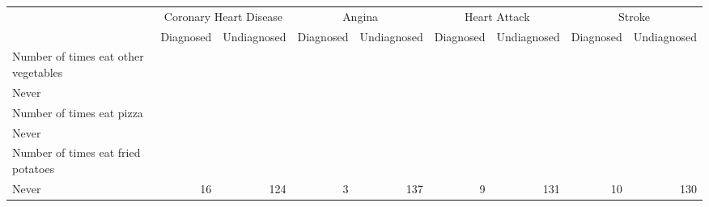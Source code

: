\documentclass{article}
\begin{document}
\begin{tabular}{lllllllll}
\cline{1-9}
\multicolumn{1}{c}{} &
  \multicolumn{2}{|c}{Coronary Heart Disease} &
  \multicolumn{2}{c}{Angina} &
  \multicolumn{2}{c}{Heart Attack} &
  \multicolumn{2}{c}{Stroke} \\
\multicolumn{1}{c}{} &
  \multicolumn{1}{|r}{Diagnosed} &
  \multicolumn{1}{r}{Undiagnosed} &
  \multicolumn{1}{r}{Diagnosed} &
  \multicolumn{1}{r}{Undiagnosed} &
  \multicolumn{1}{r}{Diagnosed} &
  \multicolumn{1}{r}{Undiagnosed} &
  \multicolumn{1}{r}{Diagnosed} &
  \multicolumn{1}{r}{Undiagnosed} \\
\cline{1-9}
\multicolumn{1}{l}{Number of times eat other vegetables} &
  \multicolumn{1}{|r}{} &
  \multicolumn{1}{r}{} &
  \multicolumn{1}{r}{} &
  \multicolumn{1}{r}{} &
  \multicolumn{1}{r}{} &
  \multicolumn{1}{r}{} &
  \multicolumn{1}{r}{} &
  \multicolumn{1}{r}{} \\
\multicolumn{1}{l}{\hspace{1em}Never} &
  \multicolumn{1}{|r}{} &
  \multicolumn{1}{r}{} &
  \multicolumn{1}{r}{} &
  \multicolumn{1}{r}{} &
  \multicolumn{1}{r}{} &
  \multicolumn{1}{r}{} &
  \multicolumn{1}{r}{} &
  \multicolumn{1}{r}{} \\
\multicolumn{1}{l}{\hspace{2em}Number of times eat pizza} &
  \multicolumn{1}{|r}{} &
  \multicolumn{1}{r}{} &
  \multicolumn{1}{r}{} &
  \multicolumn{1}{r}{} &
  \multicolumn{1}{r}{} &
  \multicolumn{1}{r}{} &
  \multicolumn{1}{r}{} &
  \multicolumn{1}{r}{} \\
\multicolumn{1}{l}{\hspace{3em}Never} &
  \multicolumn{1}{|r}{} &
  \multicolumn{1}{r}{} &
  \multicolumn{1}{r}{} &
  \multicolumn{1}{r}{} &
  \multicolumn{1}{r}{} &
  \multicolumn{1}{r}{} &
  \multicolumn{1}{r}{} &
  \multicolumn{1}{r}{} \\
\multicolumn{1}{l}{\hspace{4em}Number of times eat fried potatoes} &
  \multicolumn{1}{|r}{} &
  \multicolumn{1}{r}{} &
  \multicolumn{1}{r}{} &
  \multicolumn{1}{r}{} &
  \multicolumn{1}{r}{} &
  \multicolumn{1}{r}{} &
  \multicolumn{1}{r}{} &
  \multicolumn{1}{r}{} \\
\multicolumn{1}{l}{\hspace{5em}Never} &
  \multicolumn{1}{|r}{16} &
  \multicolumn{1}{r}{124} &
  \multicolumn{1}{r}{3} &
  \multicolumn{1}{r}{137} &
  \multicolumn{1}{r}{9} &
  \multicolumn{1}{r}{131} &
  \multicolumn{1}{r}{10} &
  \multicolumn{1}{r}{130} \\

\end{tabular}
\end{document}
